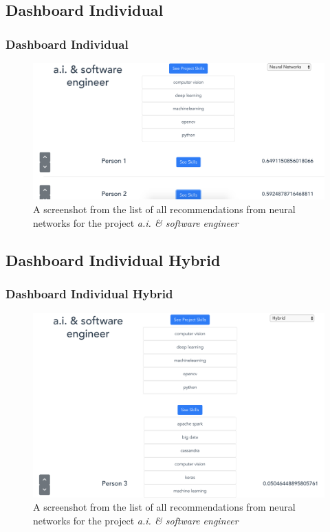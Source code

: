 \documentclass{beamer}
\begin{document}
\subsection{Dashboard Individual} 
\begin{frame}
\frametitle{Dashboard Individual}
\begin{figure}
	\includegraphics[scale=0.3]{images/DashboardIndividual} 
	\caption{A screenshot from the list of all recommendations from neural networks for the project \textit{a.i. \& software engineer}}
	\end{figure}
\end{frame}

\subsection{Dashboard Individual Hybrid} 
\begin{frame}
\frametitle{Dashboard Individual Hybrid}
\begin{figure}
	\includegraphics[scale=0.25]{images/DashboardIndividualHybrid} 
	\caption{A screenshot from the list of all recommendations from neural networks for the project \textit{a.i. \& software engineer}}
	\end{figure}
\end{frame}
\end{document}
